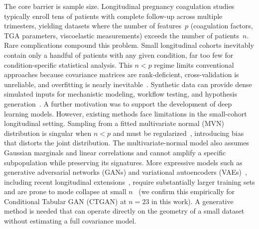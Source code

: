 The core barrier is sample size. Longitudinal pregnancy coagulation studies
typically enroll tens of patients with complete follow-up across multiple trimesters,
yielding datasets where the number of features~$p$ (coagulation factors, TGA
parameters, viscoelastic measurements) exceeds the number of patients~$n$. Rare
complications compound this problem. Small longitudinal cohorts inevitably contain
only a handful of patients with any given condition, far too few for
condition-specific statistical analysis. This $n < p$ regime limits conventional
approaches because covariance matrices are rank-deficient, cross-validation is
unreliable, and overfitting is nearly inevitable~\citep{Hastie2009}. Synthetic data can
provide dense simulated inputs for mechanistic modeling, workflow testing, and hypothesis
generation~\citep{Gonzales2023,Kuhnel2024}. A further motivation was to support the
development of deep learning models. However, existing methods face
limitations in the small-cohort longitudinal setting. Sampling from a fitted
multivariate normal (MVN) distribution is singular when $n < p$ and must be
regularized~\citep{Ledoit2004}, introducing bias that distorts the joint distribution.
The multivariate-normal model also assumes Gaussian marginals and linear correlations and
cannot amplify a specific subpopulation while preserving
its signatures. More expressive models such as generative adversarial networks (GANs) and
variational autoencoders (VAEs)~\citep{Goodfellow2014,Kingma2014,Xu2019CTGAN}, including recent longitudinal
extensions~\citep{Kuhnel2024}, require substantially larger training sets and are
prone to mode collapse at small $n$~\citep{DeMitri2025} (we confirm this empirically for Conditional Tabular GAN (CTGAN) at
$n{=}23$ in this work). A generative method is needed that can operate
directly on the geometry of a small dataset without estimating a full
covariance model.

